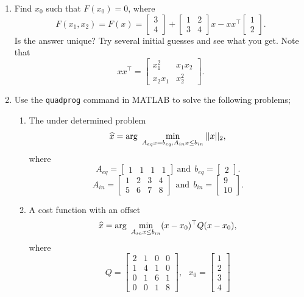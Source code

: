 \documentclass[letterpaper]{article}
\begin{document}
\begin{enumerate}
\item Find $x_0$ such that $F(x_0)=0$, where
    $$F(x_1,x_2) = F(x) = \left[\begin{array}{r} 3\\  4\end{array} \right] +   \left[\begin{array}{cc} 1 & 2 \\ 3 & 4\end{array} \right] x - x x^\top \left[\begin{array}{r} 1\\  2\end{array} \right]. $$
    Is the answer unique? Try several initial guesses and see what you get. Note that
    $$x x^\top =\left[\begin{array}{cc} x_1^2 & x_1x_2 \\ x_2 x_1 & x_2^2\end{array} \right].$$

    \item Use the \texttt{quadprog} command in MATLAB to solve the following problems;
    \begin{enumerate}
\renewcommand{\labelenumi}{(\alph{enumi})}
\setlength{\itemsep}{.1in}

    \item The under determined problem
    $$ \widehat{x} = {\rm arg}~\min_{A_{eq} x = b_{eq}, A_{in} x \le b_{in}} ||x||_2,$$
    where
    $$A_{eq} = \left[\begin{array}{rrrr}  1 & 1 & 1 &1\end{array} \right] ~\text{and} ~~ b_{eq} = \left[\begin{array}{c}  2\end{array} \right].$$
 $$A_{in}=\left[\begin{array}{rrrr}  1 & 2 & 3 &4 \\  5& 6 & 7 & 8\end{array} \right]~~\text{and} ~~ b_{in} = \left[\begin{array}{c}  9 \\ 10\end{array} \right].$$

 \item  A cost function with an offset
 $$ \widehat{x} = {\rm arg}~\min_{A_{in} x \le b_{in}} (x-x_0)^\top Q (x-x_0),$$
 where
 $$Q=\left[\begin{array}{rrrr}  2 & 1 & 0 &0 \\  1& 4 & 1 &0 \\ 0 & 1 & 6 & 1 \\ 0 & 0 &1 & 8\end{array} \right],~~~x_0=\left[\begin{array}{r}  1 \\ 2 \\ 3 \\ 4\end{array} \right]$$



\end{enumerate}
\end{enumerate}
\end{document}
